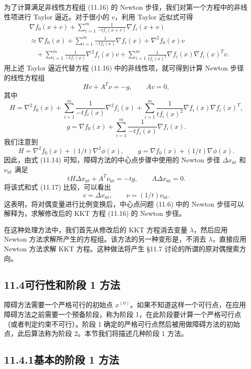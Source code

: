 \documentclass[UTF8, 12pt, fontset=fandol, oneside]{ctexart}
\begin{document}
为了计算满足非线性方程组 (11.16) 的 Newton 步径，我们对第一个方程中的非线性项进行 Taylor 逼近。对于很小的 $v$，利用 Taylor 近似式可得
\[
\begin{aligned}
&\nabla f_0(x+v)+\sum_{i=1}^m\frac{1}{-tf_i(x+v)}\nabla f_i(x+v)\\
&\approx \nabla f_0(x)+\sum_{i=1}^m\frac{1}{-tf_i(x)}\nabla f_i(x)+\nabla^2 f_0(x)v\\
&\quad +\sum_{i=1}^m\frac{1}{-tf_i(x)}\nabla^2 f_i(x)v
+\sum_{i=1}^m\frac{1}{tf_i(x)^2}\nabla f_i(x)\nabla f_i(x)^Tv.
\end{aligned}
\]
用上述 Taylor 逼近代替方程 (11.16) 中的非线性项，就可得到计算 Newton 步径的线性方程组
\begin{equation}
Hv+A^T\nu=-g,\qquad Av=0,
\tag{11.17}
\end{equation}
其中
\[
H=\nabla^2 f_0(x)+\sum_{i=1}^m\frac{1}{-tf_i(x)}\nabla^2 f_i(x)+\sum_{i=1}^m\frac{1}{tf_i(x)^2}\nabla f_i(x)\nabla f_i(x)^T,
\]
\[
g=\nabla f_0(x)+\sum_{i=1}^m\frac{1}{-tf_i(x)}\nabla f_i(x).
\]
我们注意到
\[
H=\nabla^2 f_0(x)+(1/t)\nabla^2\phi(x),\qquad
g=\nabla f_0(x)+(1/t)\nabla\phi(x).
\]
因此，由式 (11.14) 可知，障碍方法的中心点步骤中使用的 Newton 步径 $\Delta x_{\mathrm{nt}}$ 和 $\nu_{\mathrm{nt}}$ 满足
\[
tH\Delta x_{\mathrm{nt}}+A^T\nu_{\mathrm{nt}}=-tg,\qquad A\Delta x_{\mathrm{nt}}=0.
\]
将该式和式 (11.17) 比较，可以看出
\[
v=\Delta x_{\mathrm{nt}},\qquad \nu=(1/t)\nu_{\mathrm{nt}}.
\]
这表明，将对偶变量进行比例变换后，中心点问题 (11.6) 中的 Newton 步径可以解释为，求解修改后的 KKT 方程 (11.16) 的 Newton 步径。

在这种处理方法中，我们首先从修改后的 KKT 方程消去变量 $\lambda$，然后应用 Newton 方法求解所产生的方程组。该方法的另一种变形是，不消去 $\lambda$，直接应用 Newton 方法求解 KKT 方程。这种做法将产生 \S11.7 讨论的所谓的原对偶搜索方向。

\subsection*{11.4\quad 可行性和阶段 1 方法}

障碍方法需要一个严格可行的初始点 $x^{(0)}$。如果不知道这样一个可行点，在应用障碍方法之前需要一个预备阶段，称为阶段 1，在此阶段要计算一个严格可行点（或者判定约束不可行）。阶段 1 确定的严格可行点然后被用做障碍方法的初始点，此后算法称为阶段 2。本节我们将描述几种阶段 1 方法。

\subsection*{11.4.1\quad 基本的阶段 1 方法}
\end{document}
